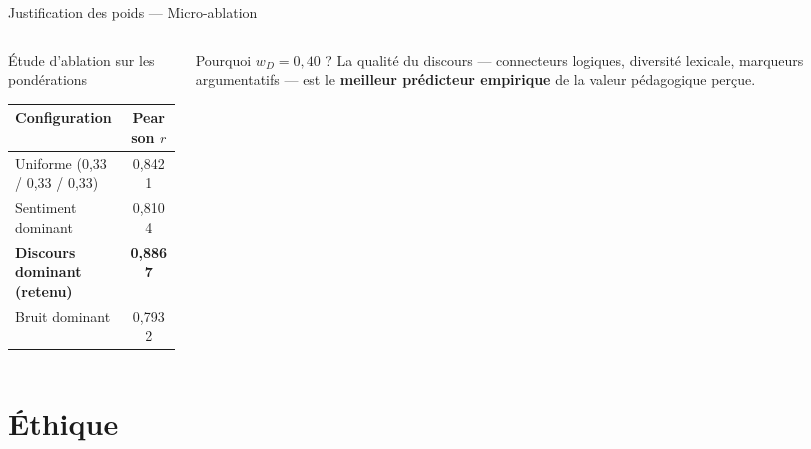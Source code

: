 \documentclass[aspectratio=169, 12pt]{beamer}
\begin{document}
\begin{frame}{Justification des poids — Micro-ablation}

  \begin{columns}[T]
    \begin{column}{0.54\textwidth}
      \begin{block}{Étude d'ablation sur les pondérations}
        \centering\small
        \begin{tabular}{lc}
          \toprule
          Configuration & Pearson $r$ \\
          \midrule
          Uniforme (0,33 / 0,33 / 0,33) & 0,8421 \\
          Sentiment dominant & 0,8104 \\
          \textbf{Discours dominant (retenu)} & \textbf{0,8867} \\
          Bruit dominant & 0,7932 \\
          \bottomrule
        \end{tabular}
      \end{block}
    \end{column}
    \begin{column}{0.43\textwidth}
      \begin{alertblock}{Pourquoi $w_D = 0{,}40$ ?}
        \small La qualité du discours — connecteurs logiques,
        diversité lexicale, marqueurs argumentatifs — est le
        \textbf{meilleur prédicteur empirique} de la valeur
        pédagogique perçue.
      \end{alertblock}
    \end{column}
  \end{columns}

\end{frame}

\section{Éthique}
\end{document}
